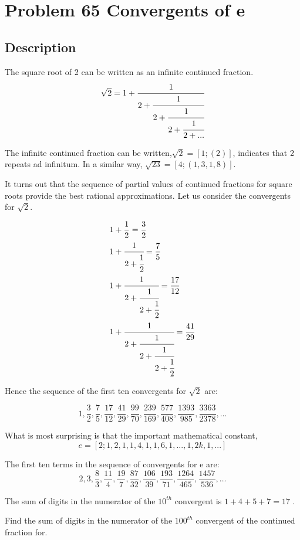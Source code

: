 \section{Problem 65 Convergents of e}
\subsection{Description}
The square root of 2 can be written as an infinite continued fraction.
\begin{equation*}
	\sqrt{2} = 1 + \cfrac{1}{2 + \cfrac{1}{2 + \cfrac{1}{2 + \cfrac{1}{2 + ...}}}}
\end{equation*}

The infinite continued fraction can be written,\( \sqrt{2} = [1; (2)] \), indicates that 2 repeats ad infinitum. In a
similar way, \( \sqrt{23} = [4; (1, 3, 1, 8)] \).

It turns out that the sequence of partial values of continued fractions for square roots provide the best rational
approximations. Let us consider the convergents for \( \sqrt{2} \).

\begin{align*}
	 & 1 + \dfrac{1}{2} = \dfrac{3}{2}                                                \\
	 & 1 + \cfrac{1}{2 + \cfrac{1}{2}} = \dfrac{7}{5}                                 \\
	 & 1 + \cfrac{1}{2 + \cfrac{1}{2 + \cfrac{1}{2}}} = \dfrac{17}{12}                \\
	 & 1 + \cfrac{1}{2 + \cfrac{1}{2 + \cfrac{1}{2 + \cfrac{1}{2}}}} = \dfrac{41}{29}
\end{align*}

Hence the sequence of the first ten convergents for \( \sqrt{2} \) are:

\begin{equation*}
	1, \dfrac{3}{2}, \dfrac{7}{5}, \dfrac{17}{12}, \dfrac{41}{29}, \dfrac{99}{70}, \dfrac{239}{169}, \dfrac{577}{408},
	\dfrac{1393}{985}, \dfrac{3363}{2378}, \dots
\end{equation*}

What is most surprising is that the important mathematical constant,
\begin{equation*}
	e = [2; 1, 2, 1, 1, 4, 1, 1, 6, 1, ... , 1, 2k, 1, ...]
\end{equation*}

The first ten terms in the sequence of convergents for e are:
\begin{equation*}
	2, 3, \dfrac{8}{3}, \dfrac{11}{4}, \dfrac{19}{7}, \dfrac{87}{32}, \dfrac{106}{39}, \dfrac{193}{71}, \dfrac{1264}{465},
	\dfrac{1457}{536}, \dots
\end{equation*}

The sum of digits in the numerator of the \( 10^{th} \) convergent is \( 1 + 4 + 5 + 7 = 17 \) .

Find the sum of digits in the numerator of the \( 100^{th} \) convergent of the continued fraction for.
